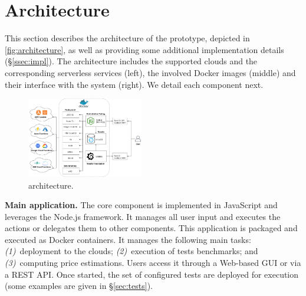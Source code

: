 \section{Architecture}
\label{sec:architecture}

This section describes the architecture of the \sys prototype, depicted in \autoref{fig:architecture}, as well as providing some additional implementation details (\S\ref{ssec:impl}).
The architecture includes the supported clouds and the corresponding serverless services (left), the involved Docker images (middle) and their interface with the system (right).
We detail each component next. 

\begin{figure}[!t]
\begin{center}
\includegraphics[width=0.45\textwidth]{bilder/main_app.png}
\caption{\sys architecture.}
\label{fig:architecture}
\end{center}
\end{figure}
\textbf{Main application.}
The \sys core component is implemented in JavaScript and leverages the Node.js framework. 
It manages all user input and executes the actions or delegates them to other components. 
This application is packaged and executed as Docker containers. 
It manages the following main tasks:
\emph{(1)}~deployment to the clouds;
\emph{(2)}~execution of tests benchmarks; and
\emph{(3)}~computing price estimations. 
Users access it through a Web-based \gls{GUI} or via a REST \gls{API}. 
Once started, the set of configured tests are deployed for execution (some examples are given in \S\ref{sec:tests}).

